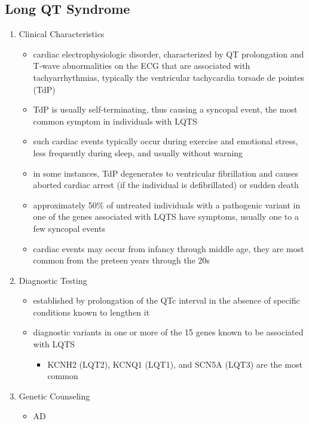 \documentclass[12pt]{scrartcl}
\begin{document}
\subsection{Long QT Syndrome}
\label{sec:orgd5a1602}
\begin{enumerate}
\item Clinical Characteristics
\label{sec:orgb297953}
\begin{itemize}
\item cardiac electrophysiologic disorder, characterized by QT
prolongation and T-wave abnormalities on the ECG that are associated
with tachyarrhythmias, typically the ventricular tachycardia torsade
de pointes (TdP)
\item TdP is usually self-terminating, thus causing a syncopal event, the
most common symptom in individuals with LQTS
\item such cardiac events typically occur during exercise and emotional
stress, less frequently during sleep, and usually without warning
\item in some instances, TdP degenerates to ventricular fibrillation and
causes aborted cardiac arrest (if the individual is defibrillated)
or sudden death
\item approximately 50\% of untreated individuals with a pathogenic variant
in one of the genes associated with LQTS have symptoms, usually one
to a few syncopal events
\item cardiac events may occur from infancy through middle age, they are
most common from the preteen years through the 20s
\end{itemize}
\item Diagnostic Testing
\label{sec:orga8f6d02}
\begin{itemize}
\item established by prolongation of the QTc interval in the absence of
specific conditions known to lengthen it
\item diagnostic variants in one or more of the 15 genes known to be
associated with LQTS
\begin{itemize}
\item KCNH2 (LQT2), KCNQ1 (LQT1), and SCN5A (LQT3) are the most common
\end{itemize}
\end{itemize}
\item Genetic Counseling
\label{sec:org2017029}
\begin{itemize}
\item AD
\end{itemize}
\end{enumerate}
\end{document}
